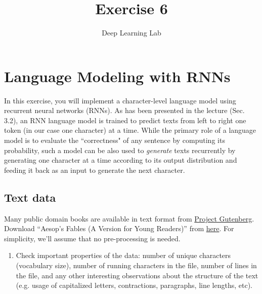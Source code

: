 \documentclass[a4paper,11pt]{article}
\title{Exercise 6}
\author{Deep Learning Lab}
\begin{document}
\maketitle

\section{Language Modeling with RNNs}

In this exercise, you will implement a character-level language model using recurrent neural networks (RNNs).
As has been presented in the lecture (Sec.\,3.2), an RNN language model is trained
to predict texts from left to right one token (in our case one character) at a time.
While the primary role of a language model is to evaluate the ``correctness" of any sentence
by computing its probability, such a model can be also used to \textit{generate} texts recurrently
by generating one character at a time according to its output distribution
and feeding it back as an input to generate the next character.

\subsection{Text data}
Many public domain books are available in text format from \href{http://www.gutenberg.org/}{Project Gutenberg}.
Download ``Aesop's Fables (A Version for Young Readers)'' from \href{http://www.gutenberg.org/files/49010/49010-0.txt}{here}.
For simplicity, we'll assume that no pre-processing is needed.
\begin{enumerate}
 \item Check important properties of the data: number of unique characters (vocabulary size),
 number of running characters in the file, number of lines in the file, and any other interesting observations
 about the structure of the text (e.g. usage of capitalized letters, contractions, paragraphs, line lengths, etc).

\end{enumerate}
\end{document}
